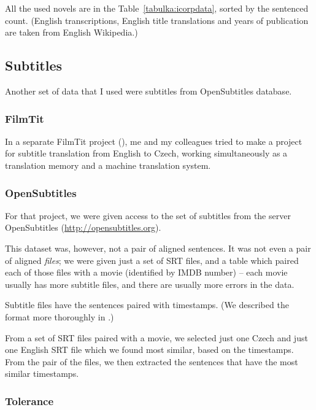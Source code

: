 All the used novels are in the Table~\ref{tabulka:icorpdata},
sorted by the sentenced count. (English transcriptions, English title translations and years of publication are taken from English Wikipedia.)

\subsection{Subtitles}
Another set of data that I used were subtitles from OpenSubtitles database.
\subsubsection{FilmTit}

In a separate FilmTit project (\cite{filmtit}), me and my colleagues  tried to make a project for subtitle translation from English to Czech, working simultaneously as a translation memory and a machine translation system.
\subsubsection{OpenSubtitles}

For that project, we were given access to the set of subtitles from the server OpenSubtitles (\url{http://opensubtitles.org}). 

This dataset was, however, not a pair of aligned sentences. It was not even a pair of aligned \emph{files}; we were given just a set of SRT files, and a table which paired each of those files with a movie (identified by IMDB number) -- each movie usually has more subtitle files, and there are usually more errors in the data. 

Subtitle files have the sentences paired with timestamps. (We described the format more thoroughly in \cite{filmtit}.)

From a set of SRT files paired with a movie, we selected just one Czech and just one English SRT file which we found most similar, based on the timestamps.
From the pair of the files, we then extracted the sentences that have the most similar timestamps.
\subsubsection{Tolerance}

